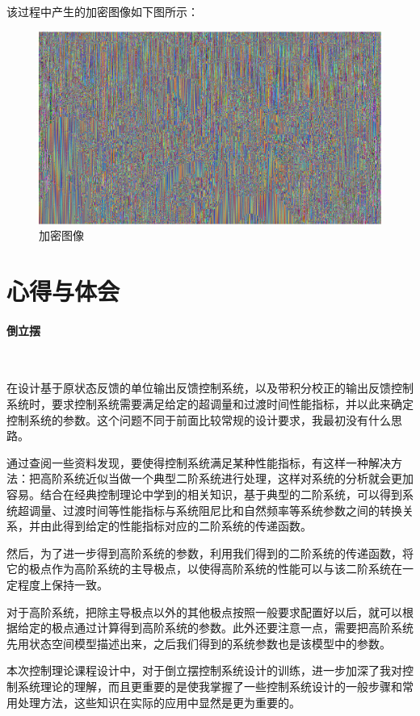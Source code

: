 \documentclass[UTF8]{article}
\begin{document}
该过程中产生的加密图像如下图所示：
\begin{figure}[H]
    \centering %
    \includegraphics[width=.6\textwidth]{figure/混沌电路-加密图像.png}
    \caption{加密图像} %
\end{figure}

%
\section{心得与体会}

\paragraph{倒立摆}~{}

在设计基于原状态反馈的单位输出反馈控制系统，以及带积分校正的输出反馈控制系统时，要求控制系统需要满足给定的超调量和过渡时间性能指标，并以此来确定控制系统的参数。这个问题不同于前面比较常规的设计要求，我最初没有什么思路。

通过查阅一些资料发现，要使得控制系统满足某种性能指标，有这样一种解决方法：把高阶系统近似当做一个典型二阶系统进行处理，这样对系统的分析就会更加容易。结合在经典控制理论中学到的相关知识，基于典型的二阶系统，可以得到系统超调量、过渡时间等性能指标与系统阻尼比和自然频率等系统参数之间的转换关系，并由此得到给定的性能指标对应的二阶系统的传递函数。

然后，为了进一步得到高阶系统的参数，利用我们得到的二阶系统的传递函数，将它的极点作为高阶系统的主导极点，以使得高阶系统的性能可以与该二阶系统在一定程度上保持一致。

对于高阶系统，把除主导极点以外的其他极点按照一般要求配置好以后，就可以根据给定的极点通过计算得到高阶系统的参数。此外还要注意一点，需要把高阶系统先用状态空间模型描述出来，之后我们得到的系统参数也是该模型中的参数。

本次控制理论课程设计中，对于倒立摆控制系统设计的训练，进一步加深了我对控制系统理论的理解，而且更重要的是使我掌握了一些控制系统设计的一般步骤和常用处理方法，这些知识在实际的应用中显然是更为重要的。
\end{document}
